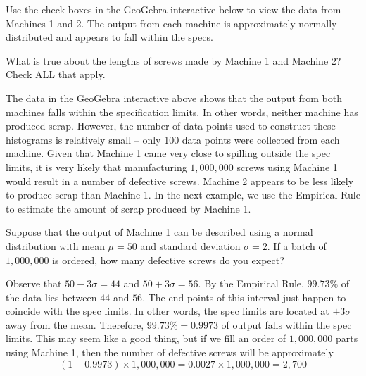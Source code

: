 \documentclass{ximera}
\begin{document}
Use the check boxes in the GeoGebra interactive below to view the data from Machines 1 and 2.  The output from each machine is approximately normally distributed and appears to fall within the specs.  

\begin{onlineOnly}
\begin{center} 
\end{center}
\end{onlineOnly}

\begin{question}\label{quest:compareMachines}
    What is true about the lengths of screws made by Machine 1 and Machine 2?  Check ALL that apply.
    \begin{selectAll}
    \end{selectAll}
\end{question}

The data in the GeoGebra interactive above shows that the output from both machines falls within the specification limits.  In other words, neither machine has produced scrap.  However, the number of data points used to construct these histograms is relatively small -- only 100 data points were collected from each machine.  Given that Machine 1 came very close to spilling outside the spec limits, it is very likely that manufacturing $1,000,000$ screws using Machine 1 would result in a number of defective screws.  Machine 2 appears to be less likely to produce scrap than Machine 1.  In the next example, we use the Empirical Rule to estimate the amount of scrap produced by Machine 1.    

\begin{example}\label{ex:defParts1}
    Suppose that the output of Machine 1 can be described using a normal distribution with mean $\mu=50$ and standard deviation $\sigma=2$.  If a batch of $1,000,000$ is ordered, how many defective screws do you expect?
    \begin{explanation}
        Observe that $50-3\sigma=44$ and $50+3\sigma=56$.  By the Empirical Rule, $99.73\%$ of the data lies between $44$ and $56$.  The end-points of this interval just happen to coincide with the spec limits.  In other words, the spec limits are located at $\pm 3\sigma$ away from the mean.  Therefore, $99.73\%=0.9973$ of output falls within the spec limits.  This may seem like a good thing, but if we fill an order of $1,000,000$ parts using Machine 1, then the number of defective screws will be approximately
        $$(1-0.9973)\times 1,000,000=0.0027\times 1,000,000=2,700$$       
    \end{explanation}
\end{example}
\end{document}
